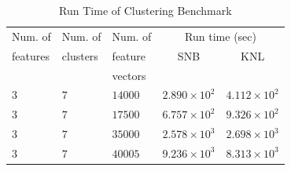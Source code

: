 \begin{table}
  \caption{Run Time of Clustering Benchmark}
  \label{tab:clusterResults}
  \begin{tabular}{lllcc}
    \toprule
    Num. of   & Num. of   & Num. of & \multicolumn{2}{c}{Run time (sec)}\\
    features  & clusters  & feature           & SNB & KNL\\
              &           & vectors           & &\\
    \midrule
    $3$ & $7$ & $14000$ & $2.890\times 10^{2}$ & $4.112\times 10^{2}$ \\
    $3$ & $7$ & $17500$ & $6.757\times 10^{2}$ & $9.326\times 10^{2}$ \\
    $3$ & $7$ & $35000$ & $2.578\times 10^{3}$ & $2.698\times 10^{3}$ \\
    $3$ & $7$ & $40005$ & $9.236\times 10^{3}$ & $8.313\times 10^{3}$ \\
    \bottomrule
  \end{tabular}
\end{table}

%

